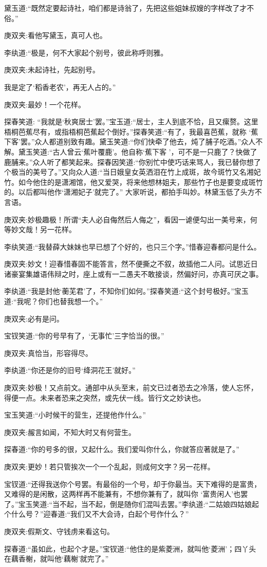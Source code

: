 \begin{parag}
    黛玉道:“既然定要起诗社，咱们都是诗翁了，先把这些姐妹叔嫂的字样改了才不俗。”\begin{note}庚双夹:看他写黛玉，真可人也。\end{note}李纨道:“极是，何不大家起个别号，彼此称呼则雅。\begin{note}庚双夹:未起诗社，先起别号。\end{note}我是定了‘稻香老农’，再无人占的。”\begin{note}庚双夹:最妙！一个花样。\end{note}探春笑道: “我就是‘秋爽居士’罢。”宝玉道:“居士，主人到底不恰，且又瘰赘。这里梧桐芭蕉尽有，或指梧桐芭蕉起个倒好。”探春笑道:“有了，我最喜芭蕉，就称 ‘蕉下客’罢。”众人都道别致有趣。黛玉笑道:“你们快牵了他去，炖了脯子吃酒。”众人不解。黛玉笑道:“古人曾云‘蕉叶覆鹿’。他自称‘蕉下客 ’，可不是一只鹿了？快做了鹿脯来。”众人听了都笑起来。探春因笑道:“你别忙中使巧话来骂人，我已替你想了个极当的美号了。”又向众人道:“当日娥皇女英洒泪在竹上成斑，故今斑竹又名湘妃竹。如今他住的是潇湘馆，他又爱哭，将来他想林姐夫，那些竹子也是要变成斑竹的。以后都叫他作‘潇湘妃子’就完了。” 大家听说，都拍手叫妙。林黛玉低了头方不言语。\begin{note}庚双夹:妙极趣极！所谓“夫人必自侮然后人侮之”，看因一谑便勾出一美号来，何等妙文哉！另一花样。\end{note}李纨笑道:“我替薛大妹妹也早已想了个好的，也只三个字。”惜春迎春都问是什么。\begin{note}庚双夹:妙文！迎春惜春固不能答言，然不便撕之不叙，故插他二人问。试思近日诸豪宴集雄语伟辩之时，座上或有一二愚夫不敢接谈，然偏好问，亦真可厌之事。\end{note}李纨道:“我是封他‘蘅芜君’了，不知你们如何。”探春笑道:“这个封号极好。”宝玉道:“我呢？你们也替我想一个。”\begin{note}庚双夹:必有是问。\end{note}宝钗笑道:“你的号早有了，‘无事忙’三字恰当的很。”\begin{note}庚双夹:真恰当，形容得尽。\end{note}李纨道:“你还是你的旧号‘绛洞花王’就好。”\begin{note}庚双夹:妙极！又点前文。通部中从头至末，前文已过者恐去之冷落，使人忘怀，得便一点。未来者恐来之突然，或先伏一线。皆行文之妙诀也。\end{note}宝玉笑道:“小时候干的营生，还提他作什么。”\begin{note}庚双夹:赧言如闻，不知大时又有何营生。\end{note}探春道:“你的号多的很，又起什么。我们爱叫你什么，你就答应著就是了。”\begin{note}庚双夹:更妙！若只管挨次一个一个乱起，则成何文字？另一花样。\end{note}宝钗道:“还得我送你个号罢。有最俗的一个号，却于你最当。天下难得的是富贵，又难得的是闲散，这两样再不能兼有，不想你兼有了，就叫你 ‘富贵闲人’也罢了。”宝玉笑道:“当不起，当不起，倒是随你们混叫去罢。”李纨道:“二姑娘四姑娘起个什么号？”迎春道:“我们又不大会诗，白起个号作什么？”\begin{note}庚双夹:假斯文、守钱虏来看这句。\end{note}探春道:“虽如此，也起个才是。”宝钗道:“他住的是紫菱洲，就叫他‘菱洲’；四丫头在藕香榭，就叫他‘藕榭’就完了。”
\end{parag}



